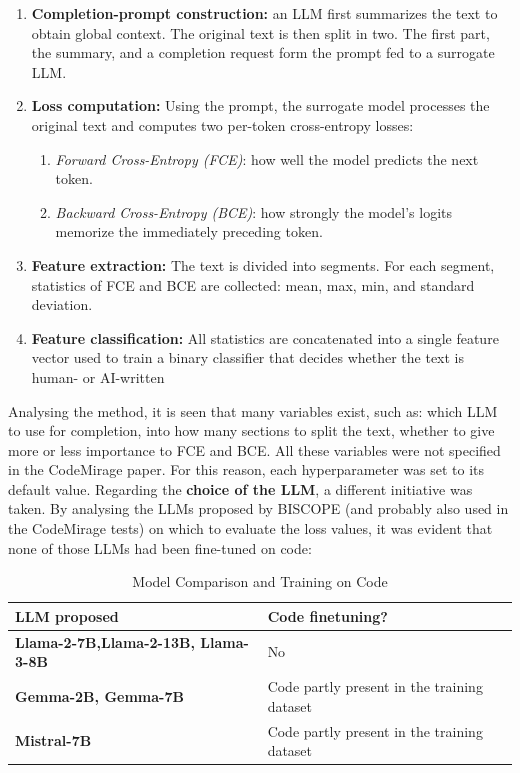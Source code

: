 \begin{enumerate}
    \item \textbf{Completion-prompt construction:} an LLM first summarizes the 
    text to obtain global context. The original text is then split in two. 
    The first part, the summary, and a completion request form the prompt fed 
    to a surrogate LLM.
    \item \textbf{Loss computation:} Using the prompt, the surrogate model processes 
    the original text and computes two per-token cross-entropy losses:
    \begin{enumerate}
        \item \textit{Forward Cross-Entropy (FCE)}: how well the model predicts the next token.
        \item \textit{Backward Cross-Entropy (BCE)}: how strongly the model’s logits memorize the immediately preceding token.
    \end{enumerate}
    \item \textbf{Feature extraction:} The text is divided into segments. 
    For each segment, statistics of FCE and BCE are 
    collected: mean, max, min, and standard deviation.

    \item \textbf{Feature classification:} All statistics are concatenated into a 
    single feature vector used to train a binary classifier that decides 
    whether the text is human- or AI-written
\end{enumerate}




Analysing the method, it is seen that many variables exist, such as: 
which LLM to use for completion, into how many sections to split 
the text, whether to give more or less importance to FCE and BCE. 
All these variables were not specified in the CodeMirage paper. 
For this reason, each hyperparameter was set to its default value.
Regarding the \textbf{choice of the LLM}, a different initiative was taken. 
By analysing the LLMs proposed by BISCOPE (and probably also used in the 
CodeMirage tests) on which to evaluate the loss values, it was evident 
that none of those LLMs had been fine-tuned on code:

\begin{table}[ht]
\centering
\begin{tabular}{|p{}|p{}|}
\hline
\textbf{LLM proposed} & \textbf{Code finetuning?}  \\
\hline
\textbf{Llama-2-7B\cite{touvron2023llama},Llama-2-13B\cite{touvron2023llama}, Llama-3-8B\cite{dubey2024llama}} & No  \\
\hline
\textbf{Gemma-2B\cite{team2024gemma}, Gemma-7B\cite{team2024gemma}} & Code partly present in the training dataset \\
\hline
\textbf{Mistral-7B\cite{jiang2023mistral}} & Code partly present in the training dataset  \\
\hline
\end{tabular}
\caption{Model Comparison and Training on Code}
\label{tab:modelli_codice}
\end{table}

